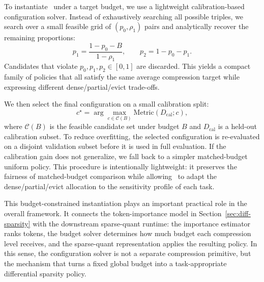 To instantiate \method\ under a target budget, we use a lightweight calibration-based configuration solver.
Instead of exhaustively searching all possible triples, we search over a small feasible grid of $(p_0,\rho_1)$ pairs
and analytically recover the remaining proportions:
\begin{equation}
p_1 = \frac{1 - p_0 - B}{1 - \rho_1},
\qquad
p_2 = 1 - p_0 - p_1.
\label{eq:budget_solver}
\end{equation}
Candidates that violate $p_0,p_1,p_2 \in [0,1]$ are discarded.
This yields a compact family of policies that all satisfy the same average compression target while expressing
different dense/partial/evict trade-offs.

We then select the final configuration on a small calibration split:
\begin{equation}
c^\star = \arg\max_{c \in \mathcal{C}(B)} \mathrm{Metric}(D_{\mathrm{cal}}; c),
\label{eq:calibration_objective}
\end{equation}
where $\mathcal{C}(B)$ is the feasible candidate set under budget $B$ and $D_{\mathrm{cal}}$ is a held-out calibration subset.
To reduce overfitting, the selected configuration is re-evaluated on a disjoint validation subset before it is used in
full evaluation. If the calibration gain does not generalize, we fall back to a simpler matched-budget uniform policy.
This procedure is intentionally lightweight: it preserves the fairness of matched-budget comparison while allowing
\method\ to adapt the dense/partial/evict allocation to the sensitivity profile of each task.

This budget-constrained instantiation plays an important practical role in the overall framework.
It connects the token-importance model in Section~\ref{sec:diff-sparsity} with the downstream sparse-quant runtime:
the importance estimator ranks tokens, the budget solver determines how much budget each compression level receives,
and the sparse-quant representation applies the resulting policy.
In this sense, the configuration solver is not a separate compression primitive, but the mechanism that turns
a fixed global budget into a task-appropriate differential sparsity policy.
